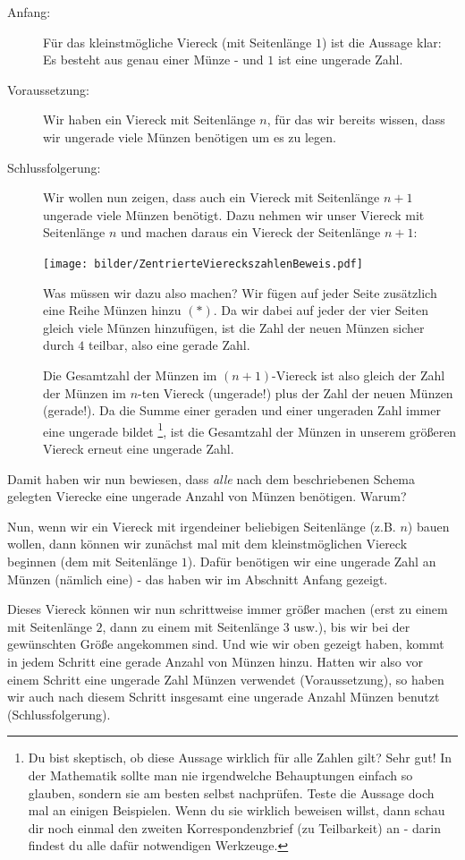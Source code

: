 \documentclass[a4paper,ngerman,12pt]{scrartcl}
\theoremstyle{definition}
\theoremstyle{plain}
\theoremstyle{remark}
\begin{document}
\begin{description}
	\item[Anfang:] Für das kleinstmögliche Viereck (mit Seitenlänge $1$) ist die Aussage klar: Es besteht aus genau einer Münze - und $1$ ist eine ungerade Zahl.
	\item[Voraussetzung:] Wir haben ein Viereck mit Seitenlänge $n$, für das wir bereits wissen, dass wir ungerade viele Münzen benötigen um es zu legen.
	\item[Schlussfolgerung:] Wir wollen nun zeigen, dass auch ein Viereck mit Seitenlänge $n+1$ ungerade viele Münzen benötigt. Dazu nehmen wir unser Viereck mit Seitenlänge $n$ und machen daraus ein Viereck der Seitenlänge $n+1$:
	\begin{center}
		\texttt{[image: bilder/ZentrierteViereckszahlenBeweis.pdf]}
	\end{center}
	Was müssen wir dazu also machen? Wir fügen auf jeder Seite zusätzlich eine Reihe Münzen hinzu $(\ast)$. Da wir dabei auf jeder der vier Seiten gleich viele Münzen hinzufügen, ist die Zahl der neuen Münzen sicher durch $4$ teilbar, also eine gerade Zahl.
	
	Die Gesamtzahl der Münzen im $(n+1)$-Viereck ist also gleich der Zahl der Münzen im $n$-ten Viereck (ungerade!) plus der Zahl der neuen Münzen (gerade!). Da die Summe einer geraden und einer ungeraden Zahl immer eine ungerade bildet
	\footnote{Du bist skeptisch, ob diese Aussage wirklich für alle Zahlen gilt? Sehr gut! In der Mathematik sollte man nie irgendwelche Behauptungen einfach so glauben, sondern sie am besten selbst nachprüfen. Teste die Aussage doch mal an einigen Beispielen. Wenn du sie wirklich beweisen willst, dann schau dir noch einmal den zweiten Korrespondenzbrief (zu Teilbarkeit) an - darin findest du alle dafür notwendigen Werkzeuge.},
	ist die Gesamtzahl der Münzen in unserem größeren Viereck erneut eine ungerade Zahl.
\end{description}

Damit haben wir nun bewiesen, dass \emph{alle} nach dem beschriebenen Schema gelegten Vierecke eine ungerade Anzahl von Münzen benötigen. Warum?

Nun, wenn wir ein Viereck mit irgendeiner beliebigen Seitenlänge (z.B. $n$) bauen wollen, dann können wir zunächst mal mit dem kleinstmöglichen Viereck beginnen (dem mit Seitenlänge $1$). Dafür benötigen wir eine ungerade Zahl an Münzen (nämlich eine) - das haben wir im Abschnitt \glqq Anfang\grqq{} gezeigt.

Dieses Viereck können wir nun schrittweise immer größer machen (erst zu einem mit Seitenlänge $2$, dann zu einem mit Seitenlänge $3$ usw.), bis wir bei der gewünschten Größe angekommen sind. Und wie wir oben gezeigt haben, kommt in jedem Schritt eine gerade Anzahl von Münzen hinzu. Hatten wir also vor einem Schritt eine ungerade Zahl Münzen verwendet (\glqq Voraussetzung\grqq ), so haben wir auch nach diesem Schritt insgesamt eine ungerade Anzahl Münzen benutzt (\glqq Schlussfolgerung\grqq ).
\end{document}
